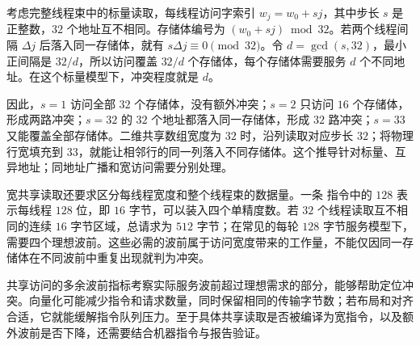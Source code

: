 考虑完整线程束中的标量读取，每线程访问字索引 $w_j=w_0+sj$，其中步长 $s$ 是正整数，$32$ 个地址互不相同。存储体编号为 $(w_0+sj)\bmod32$。若两个线程间隔 $\Delta j$ 后落入同一存储体，就有 $s\Delta j\equiv0\pmod{32}$。令 $d=\gcd(s,32)$，最小正间隔是 $32/d$，所以访问覆盖 $32/d$ 个存储体，每个存储体需要服务 $d$ 个不同地址。在这个标量模型下，冲突程度就是 $d$。

因此，$s=1$ 访问全部 $32$ 个存储体，没有额外冲突；$s=2$ 只访问 $16$ 个存储体，形成两路冲突；$s=32$ 的 $32$ 个地址都落入同一存储体，形成 $32$ 路冲突；$s=33$ 又能覆盖全部存储体。二维共享数组宽度为 $32$ 时，沿列读取对应步长 $32$；将物理行宽填充到 $33$，就能让相邻行的同一列落入不同存储体。这个推导针对标量、互异地址；同地址广播和宽访问需要分别处理。

宽共享读取还要求区分每线程宽度和整个线程束的数据量。一条  指令中的 $128$ 表示每线程 $128$ 位，即 $16$ 字节，可以装入四个单精度数。若 $32$ 个线程读取互不相同的连续 $16$ 字节区域，总请求为 $512$ 字节；在常见的每轮 $128$ 字节服务模型下，需要四个理想波前。这些必需的波前属于访问宽度带来的工作量，不能仅因同一存储体在不同波前中重复出现就判为冲突。

共享访问的多余波前指标考察实际服务波前超过理想需求的部分，能够帮助定位冲突。向量化可能减少指令和请求数量，同时保留相同的传输字节数；若布局和对齐合适，它就能缓解指令队列压力。至于具体共享读取是否被编译为宽指令，以及额外波前是否下降，还需要结合机器指令与报告验证。
